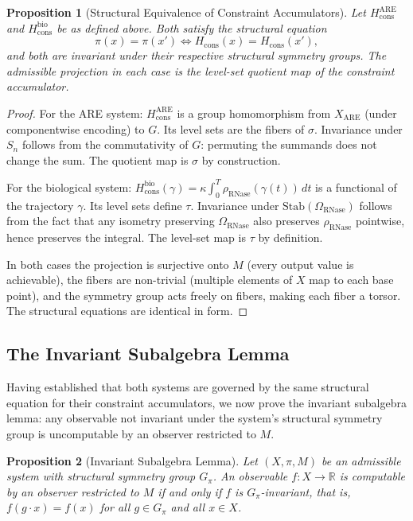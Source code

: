 \documentclass[12pt, a4paper]{article}
\theoremstyle{essaystyle}
\newtheorem{proposition}{Proposition}
\begin{document}
\begin{proposition}[Structural Equivalence of Constraint Accumulators]
Let $H_{\mathrm{cons}}^{\mathrm{ARE}}$ and $H_{\mathrm{cons}}^{\mathrm{bio}}$ be as
defined above. Both satisfy the structural equation
\[
\pi(x) = \pi(x') \iff H_{\mathrm{cons}}(x) = H_{\mathrm{cons}}(x'),
\]
and both are invariant under their respective structural symmetry groups. The admissible
projection in each case is the level-set quotient map of the constraint accumulator.
\end{proposition}

\begin{proof}
For the ARE system: $H_{\mathrm{cons}}^{\mathrm{ARE}}$ is a group homomorphism from
$X_{\mathrm{ARE}}$ (under componentwise encoding) to $G$. Its level sets are the fibers
of $\sigma$. Invariance under $S_n$ follows from the commutativity of $G$: permuting
the summands does not change the sum. The quotient map is $\sigma$ by construction.

For the biological system: $H_{\mathrm{cons}}^{\mathrm{bio}}(\gamma) = \kappa \int_0^T
\rho_{\mathrm{RNase}}(\gamma(t))\,dt$ is a functional of the trajectory $\gamma$. Its
level sets define $\tau$. Invariance under $\mathrm{Stab}(\Omega_{\mathrm{RNase}})$
follows from the fact that any isometry preserving $\Omega_{\mathrm{RNase}}$ also
preserves $\rho_{\mathrm{RNase}}$ pointwise, hence preserves the integral. The level-set
map is $\tau$ by definition.

In both cases the projection is surjective onto $M$ (every output value is achievable),
the fibers are non-trivial (multiple elements of $X$ map to each base point), and the
symmetry group acts freely on fibers, making each fiber a torsor. The structural
equations are identical in form.
\end{proof}

\subsection{The Invariant Subalgebra Lemma}

Having established that both systems are governed by the same structural equation for
their constraint accumulators, we now prove the invariant subalgebra lemma: any
observable not invariant under the system's structural symmetry group is uncomputable
by an observer restricted to $M$.

\begin{proposition}[Invariant Subalgebra Lemma]
Let $(X, \pi, M)$ be an admissible system with structural symmetry group $G_\pi$.
An observable $f : X \to \mathbb{R}$ is computable by an observer restricted to $M$
if and only if $f$ is $G_\pi$-invariant, that is, $f(g \cdot x) = f(x)$ for all
$g \in G_\pi$ and all $x \in X$.
\end{proposition}
\end{document}
